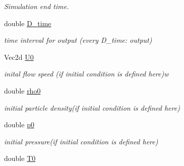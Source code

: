 \begin{CompactItemize}
\begin{CompactList}\small\item\em Simulation end time. \item\end{CompactList}\item 
\hypertarget{classInitiation_e6599efb2ef3de1c552d39ba6ce5fe5e}{
double \hyperlink{classInitiation_e6599efb2ef3de1c552d39ba6ce5fe5e}{D\_\-time}}
\label{classInitiation_e6599efb2ef3de1c552d39ba6ce5fe5e}

\begin{CompactList}\small\item\em time interval for output (every D\_\-time: output) \item\end{CompactList}\item 
\hypertarget{classInitiation_8f3749288efc593efb8c6b2e5da2dce2}{
Vec2d \hyperlink{classInitiation_8f3749288efc593efb8c6b2e5da2dce2}{U0}}
\label{classInitiation_8f3749288efc593efb8c6b2e5da2dce2}

\begin{CompactList}\small\item\em inital flow speed (if initial condition is defined here)w \item\end{CompactList}\item 
\hypertarget{classInitiation_a426f5569c652979800af92d6d4dd033}{
double \hyperlink{classInitiation_a426f5569c652979800af92d6d4dd033}{rho0}}
\label{classInitiation_a426f5569c652979800af92d6d4dd033}

\begin{CompactList}\small\item\em initial particle density(if initial condition is defined here) \item\end{CompactList}\item 
\hypertarget{classInitiation_d108934b865ac8267f61d1e04339fea0}{
double \hyperlink{classInitiation_d108934b865ac8267f61d1e04339fea0}{p0}}
\label{classInitiation_d108934b865ac8267f61d1e04339fea0}

\begin{CompactList}\small\item\em initial pressure(if initial condition is defined here) \item\end{CompactList}\item 
\hypertarget{classInitiation_b8db429b0356e54c88d8769191e6f550}{
double \hyperlink{classInitiation_b8db429b0356e54c88d8769191e6f550}{T0}}
\label{classInitiation_b8db429b0356e54c88d8769191e6f550}


\end{CompactItemize}
